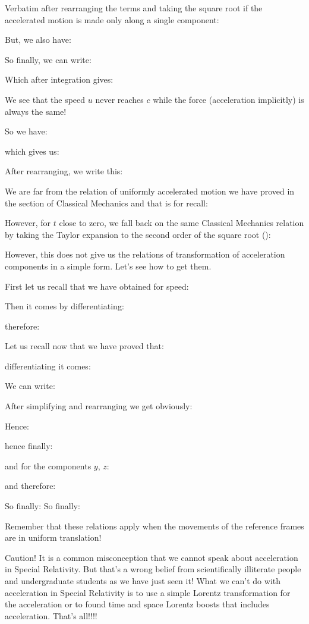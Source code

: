 	Verbatim after rearranging the terms and taking the square root if the accelerated motion is made only along a single component:
	
	But, we also have:
	
	So finally, we can write:
	
	Which after integration gives:
	
	We see that the speed $u$ never reaches $c$ while the force (acceleration implicitly) is always the same!

	So we have:
	
	which gives us:
	
	After rearranging, we write this:
	
	We are far from the relation of uniformly accelerated motion we have proved in the section of Classical Mechanics and that is for recall:
	
	However, for $t$ close to zero, we fall back on the same Classical Mechanics relation by taking the Taylor expansion to the second order of the square root ():
	
	However, this does not give us the relations of transformation of acceleration components in a simple form. Let's see how to get them.

	First let us recall that we have obtained for speed:
	
	Then it comes by differentiating:
	
	therefore:
	
	Let us recall now that we have proved that:
	
	differentiating it comes:
	
	We can write:
	
	After simplifying and rearranging we get obviously:
	
	Hence:
	
	hence finally:
	
	and for the components $y$, $z$:
	
	and therefore:
	
	So finally:
	So finally:
	
	Remember that these relations apply when the movements of the reference frames are in uniform translation!
	
	\begin{tcolorbox}[colback=red!5,borderline={1mm}{2mm}{red!5},arc=0mm,boxrule=0pt]
	\bcbombe Caution! It is a common misconception that we cannot speak about acceleration in Special Relativity. But that's a wrong belief from scientifically illiterate people and undergraduate students as we have just seen it! What we can't do with acceleration in Special Relativity is to use a simple Lorentz transformation for the acceleration or to found time and space Lorentz boosts that includes acceleration. That's all!!!!
	\end{tcolorbox}
	
